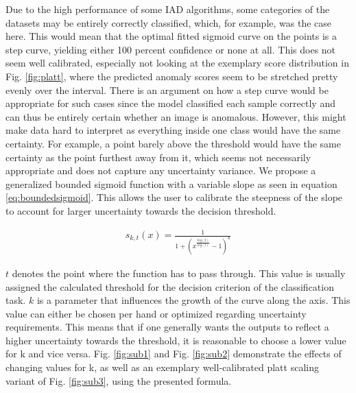 Due to the high performance of some IAD algorithms, some categories 
of the datasets may be entirely correctly classified, which, for example, was the case here. This would mean that the optimal fitted sigmoid curve on the points 
is a step curve, yielding either 100 percent confidence or none at all. This does not seem well calibrated, especially not looking at the exemplary score distribution in Fig. \ref{fig:platt}, where the predicted anomaly scores seem to be stretched pretty evenly over the interval. There is an argument on how a step 
curve would be appropriate for such cases since the model classified each sample correctly and can thus be entirely certain whether an 
image is anomalous. However, this might make data hard to interpret as everything inside one class 
would have the same certainty. For example, a point barely above the threshold would have the same certainty as the point furthest away from it, 
which seems not necessarily appropriate and does not capture any uncertainty variance.
We propose a generalized bounded sigmoid function with a variable slope \cite{bounded_sigmoid} as seen in equation \ref{eq:boundedsigmoid}. This allows the user to calibrate the steepness of the slope to account for larger uncertainty 
towards the decision threshold.

\begin{equation}
    \label{eq:boundedsigmoid}
    \begin{split}
        s_{k, t}(x) = \frac{1}{1 + (x^{\frac{log(2)}{log(t)}} - 1)^{k}}
    \end{split}
\end{equation}

$t$ denotes the point where the function has to pass through. This value is usually assigned the calculated threshold for the decision criterion of the classification task. $k$ is a parameter 
that influences the growth of the curve along the axis. This value can either be chosen per hand or optimized regarding uncertainty requirements. This means that if one generally wants the 
outputs to reflect a higher uncertainty towards the threshold, it is reasonable to choose a lower value for k and vice versa. Fig. \ref{fig:sub1} and Fig. \ref{fig:sub2} demonstrate the effects of changing values for k, as well 
as an exemplary well-calibrated platt scaling variant of Fig. \ref{fig:sub3}, using the presented formula.

